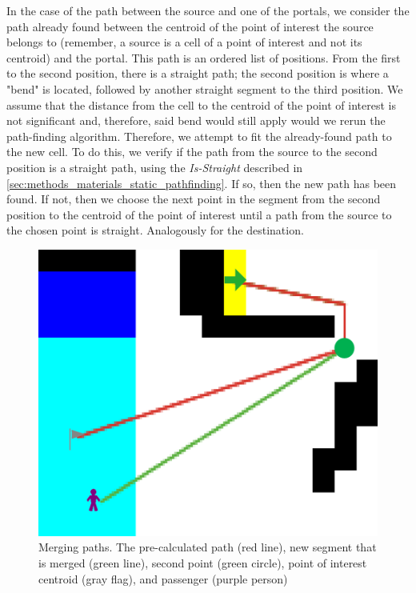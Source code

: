 In the case of the path between the source and one of the portals, we consider the path already found between the centroid of the point of interest the source belongs to (remember, a source is a cell of a point of interest and not its centroid) and the portal. This path is an ordered list of positions. From the first to the second position, there is a straight path; the second position is where a "bend" is located, followed by another straight segment to the third position. We assume that the distance from the cell to the centroid of the point of interest is not significant and, therefore, said bend would still apply would we rerun the path-finding algorithm. Therefore, we attempt to fit the already-found path to the new cell. To do this, we verify if the path from the source to the second position is a straight path, using the \textit{Is-Straight} described in \autoref{sec:methods_materials_static_pathfinding}. If so, then the new path has been found. If not, then we choose the next point in the segment from the second position to the centroid of the point of interest until a path from the source to the chosen point is straight. Analogously for the destination. \\

\begin{figure}
    \centering
    \includegraphics[width=\columnwidth]{assets/merge_path_straight.png}
    \caption{Merging paths. The pre-calculated path (red line), new segment that is merged (green line), second point (green circle), point of interest centroid (gray flag), and passenger (purple person)}
    \label{fig:merge_path_straight}
\end{figure}


